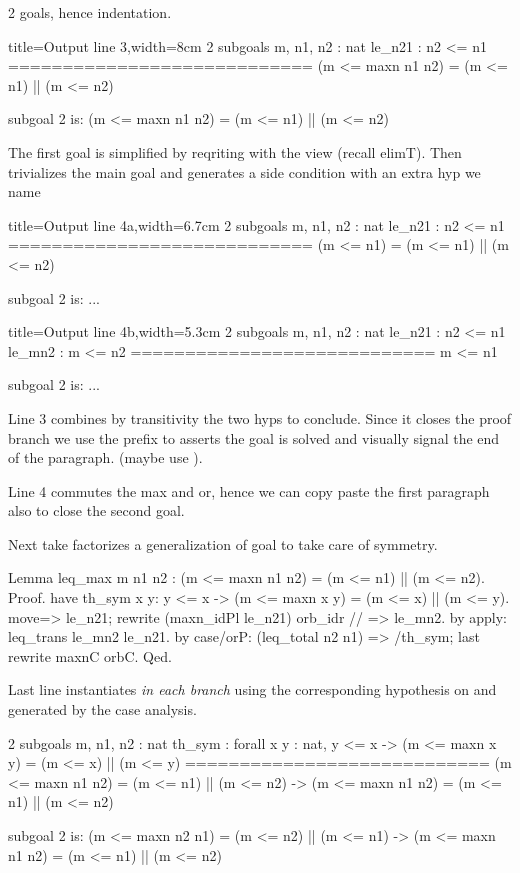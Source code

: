 2 goals, hence indentation.

\begin{coqout}{}{title=Output line 3,width=8cm}
2 subgoals
m, n1, n2 : nat
le_n21 : n2 <= n1
============================
(m <= maxn n1 n2) = (m <= n1) || (m <= n2)

subgoal 2 is:
(m <= maxn n1 n2) = (m <= n1) || (m <= n2)
\end{coqout}

The first goal is simplified by
reqriting with the  view (recall elimT).  Then
 trivializes the main goal and generates a side condition
with an extra hyp we name 

\begin{coqout}{}{title=Output line 4a,width=6.7cm}
2 subgoals
m, n1, n2 : nat
le_n21 : n2 <= n1
============================
(m <= n1) = (m <= n1) || (m <= n2)

subgoal 2 is: ...
\end{coqout}
\begin{coqout}{}{title=Output line 4b,width=5.3cm}
2 subgoals
m, n1, n2 : nat
le_n21 : n2 <= n1
le_mn2 : m <= n2
============================
m <= n1

subgoal 2 is: ...
\end{coqout}

Line 3 combines by transitivity the two hyps to conclude.
Since it closes the proof branch we use the prefix 
to asserts the goal is solved and visually signal the end of the paragraph.
(maybe use ).

Line 4 commutes the max and or, hence we can copy paste the first paragraph
also to close the second goal.

Next take factorizes a generalization of goal to take care of symmetry.

\begin{coq}{}{}
Lemma leq_max m n1 n2 : (m <= maxn n1 n2) = (m <= n1) || (m <= n2).
Proof.
have th_sym x y: y <= x -> (m <= maxn x y) = (m <= x) || (m <= y).
  move=> le_n21; rewrite (maxn_idPl le_n21) orb_idr // => le_mn2.
  by apply: leq_trans le_mn2 le_n21.
by case/orP: (leq_total n2 n1) => /th_sym; last rewrite maxnC orbC.
Qed.
\end{coq}

Last line instantiates  \emph{in each branch} using the corresponding
hypothesis on  and  generated by the case analysis.

\begin{coqout}{}{}
2 subgoals
m, n1, n2 : nat
th_sym : forall x y : nat,
         y <= x -> (m <= maxn x y) = (m <= x) || (m <= y)
============================
(m <= maxn n1 n2) = (m <= n1) || (m <= n2) ->
(m <= maxn n1 n2) = (m <= n1) || (m <= n2)

subgoal 2 is:
(m <= maxn n2 n1) = (m <= n2) || (m <= n1) ->
(m <= maxn n1 n2) = (m <= n1) || (m <= n2)
\end{coqout}

